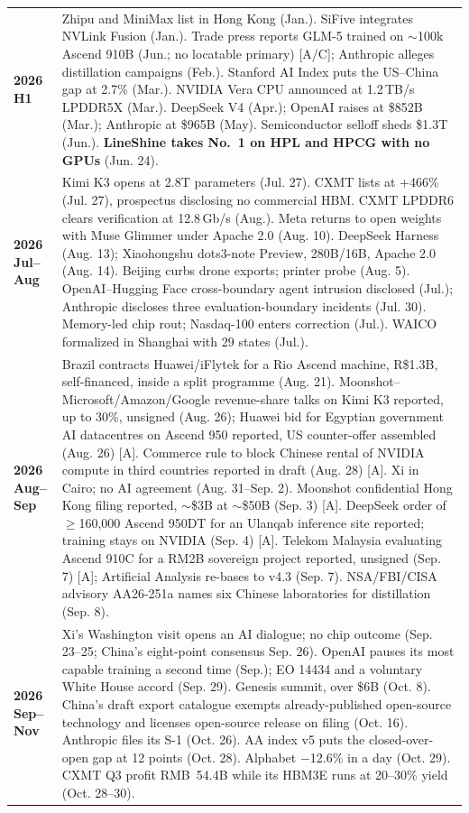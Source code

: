 \begin{table}[htbp]
\begin{tabular}{p{16mm}p{134mm}}
    \addlinespace
    \textbf{2026 H1} & Zhipu and MiniMax list in Hong Kong (Jan.). SiFive integrates NVLink Fusion (Jan.). Trade press reports GLM-5 trained on $\sim$100k Ascend 910B (Jun.; no locatable primary) [A/C]; Anthropic alleges distillation campaigns (Feb.). Stanford AI Index puts the US--China gap at 2.7\% (Mar.). NVIDIA Vera CPU announced at 1.2\,TB/s LPDDR5X (Mar.). DeepSeek V4 (Apr.); OpenAI raises at \$852B (Mar.); Anthropic at \$965B (May). Semiconductor selloff sheds \$1.3T (Jun.). \textbf{LineShine takes No.~1 on HPL and HPCG with no GPUs} (Jun. 24). \\
    \addlinespace
    \textbf{2026 Jul--Aug} & Kimi K3 opens at 2.8T parameters (Jul. 27). CXMT lists at +466\% (Jul. 27), prospectus disclosing no commercial HBM. CXMT LPDDR6 clears verification at 12.8\,Gb/s (Aug.). Meta returns to open weights with Muse Glimmer under Apache 2.0 (Aug. 10). DeepSeek Harness (Aug. 13); Xiaohongshu dots3-note Preview, 280B/16B, Apache 2.0 (Aug. 14). Beijing curbs drone exports; printer probe (Aug. 5). OpenAI--Hugging Face cross-boundary agent intrusion disclosed (Jul.); Anthropic discloses three evaluation-boundary incidents (Jul. 30). Memory-led chip rout; Nasdaq-100 enters correction (Jul.). WAICO formalized in Shanghai with 29 states (Jul.). \\
    \addlinespace
    \textbf{2026 Aug--Sep} & Brazil contracts Huawei/iFlytek for a Rio Ascend machine, R\$1.3B, self-financed, inside a split programme (Aug. 21). Moonshot--Microsoft/Amazon/Google revenue-share talks on Kimi K3 reported, up to 30\%, unsigned (Aug. 26); Huawei bid for Egyptian government AI datacentres on Ascend 950 reported, US counter-offer assembled (Aug. 26) [A]. Commerce rule to block Chinese rental of NVIDIA compute in third countries reported in draft (Aug. 28) [A]. Xi in Cairo; no AI agreement (Aug. 31--Sep. 2). Moonshot confidential Hong Kong filing reported, $\sim$\$3B at $\sim$\$50B (Sep. 3) [A]. DeepSeek order of $\geq$160{,}000 Ascend 950DT for an Ulanqab inference site reported; training stays on NVIDIA (Sep. 4) [A]. Telekom Malaysia evaluating Ascend 910C for a RM2B sovereign project reported, unsigned (Sep. 7) [A]; Artificial Analysis re-bases to v4.3 (Sep. 7). NSA/FBI/CISA advisory AA26-251a names six Chinese laboratories for distillation (Sep. 8). \\
    \addlinespace
    \textbf{2026 Sep--Nov} & Xi's Washington visit opens an AI dialogue; no chip outcome (Sep. 23--25; China's eight-point consensus Sep. 26). OpenAI pauses its most capable training a second time (Sep.); EO 14434 and a voluntary White House accord (Sep. 29). Genesis summit, over \$6B (Oct. 8). China's draft export catalogue exempts already-published open-source technology and licenses open-source release on filing (Oct. 16). Anthropic files its S-1 (Oct. 26). AA index v5 puts the closed-over-open gap at 12 points (Oct. 28). Alphabet $-$12.6\% in a day (Oct. 29). CXMT Q3 profit RMB~54.4B while its HBM3E runs at 20--30\% yield (Oct. 28--30). \\
    \bottomrule
  \end{tabular}
\end{table}

